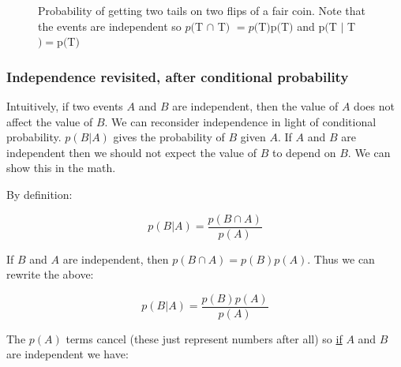 \documentclass[]{article}
\theoremstyle{definition}
\begin{document}
\begin{figure}[h!]%
    \centering
    \qquad
    \caption{Probability of getting two tails on two flips of a fair coin. Note that the events are independent so $p($T $ \cap $ T$)$ $= p($T$)$p$($T$)$ and  p$($T $\vert$ T$)=$p$($T$)$}%
    \label{fig:example}%
\end{figure}

\subsubsection{Independence revisited, after conditional probability} 

Intuitively, if two events $A$ and $B$ are independent, then the value of $A$ does not affect the value of $B$. We can reconsider independence in light of conditional probability. $p(B|A)$ gives the probability of $B$ given $A$. If $A$ and $B$ are independent then we should not expect the value of $B$ to depend on $B$. We can show this in the math. 

By definition:

\begin{equation}
p(B|A) = \frac{p(B \cap A)}{p(A)}
\end{equation}

If $B$ and $A$ are independent, then $p(B \cap A) = p(B)p(A)$. Thus we can rewrite the above:

\begin{equation}
p(B|A) = \frac{p(B)p(A)}{p(A)}
\end{equation}

The $p(A)$ terms cancel (these just represent numbers after all) so \underline{if} $A$ and $B$ are independent we have:
\end{document}
